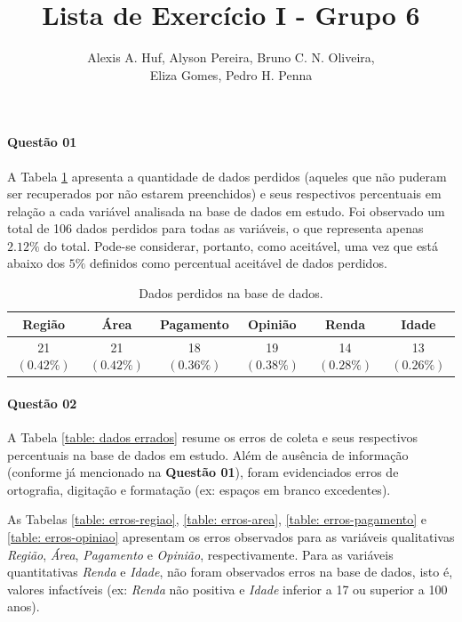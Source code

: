\documentclass[10pt,a4paper,oneside]{article}
\author{%
	Alexis A. Huf, %
	Alyson Pereira, %
	Bruno C. N. Oliveira,\\%
	Eliza Gomes, %
	Pedro H. Penna
	}
\title{Lista de Exercício I - Grupo 6}
\begin{document}
\maketitle

\paragraph{Questão 01}

A Tabela \ref{table: dados perdidos} apresenta a quantidade de dados perdidos (aqueles que não puderam ser recuperados por não estarem preenchidos) e seus respectivos percentuais em relação a cada variável analisada na base de dados em estudo. Foi observado um total de 106 dados perdidos para todas as variáveis, o que representa apenas $2.12\%$ do total. Pode-se considerar, portanto, como aceitável, uma vez que está abaixo dos $5\%$ definidos como percentual aceitável de dados perdidos.

\begin{table}[h]
\centering
\caption{Dados perdidos na base de dados.}
\label{table: dados perdidos}
\vspace{0.5em}
\begin{tabular}{c c c c c c}
	\toprule
	\textbf{Região} & \textbf{Área} & \textbf{Pagamento} & \textbf{Opinião} & \textbf{Renda} & \textbf{Idade} \\
	\midrule
	21 $(0.42\%)$   & 21 $(0.42\%)$ & 18 $(0.36\%)$      & 19 $(0.38\%)$    & 14 $(0.28\%)$  & 13 $(0.26\%)$ \\
	\bottomrule
\end{tabular}
\end{table}

%
%
\paragraph{Questão 02}

A Tabela \ref{table: dados errados} resume os erros de coleta e seus respectivos percentuais na base de dados em estudo. Além de ausência de informação (conforme já mencionado na \textbf{Questão 01}), foram evidenciados erros de ortografia, digitação e formatação (ex: espaços em branco excedentes). 

As Tabelas \ref{table: erros-regiao}, \ref{table: erros-area}, \ref{table: erros-pagamento} e \ref{table: erros-opiniao} apresentam os erros observados para as variáveis qualitativas \textit{Região}, \textit{Área}, \textit{Pagamento} e \textit{Opinião}, respectivamente.
Para as variáveis quantitativas \textit{Renda} e \textit{Idade}, não foram observados erros na base de dados, isto é, valores infactíveis (ex: \textit{Renda} não positiva e \textit{Idade} inferior a 17 ou superior a 100 anos).
\end{document}
